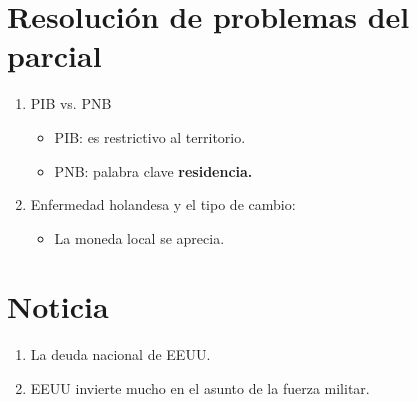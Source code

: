 \section{Resolución de problemas del parcial}
\begin{enumerate}
    \item PIB vs. PNB
        \begin{itemize}
            \item PIB: es restrictivo al territorio.
            \item PNB: palabra clave \textbf{residencia.}
        \end{itemize}
    \item Enfermedad holandesa y el tipo de cambio:
        \begin{itemize}
            \item La moneda local se aprecia.
        \end{itemize}
\end{enumerate}

\section{Noticia }
\begin{enumerate}
    \item La deuda nacional de EEUU.
    \item EEUU invierte mucho en el asunto de la fuerza militar.
\end{enumerate}

